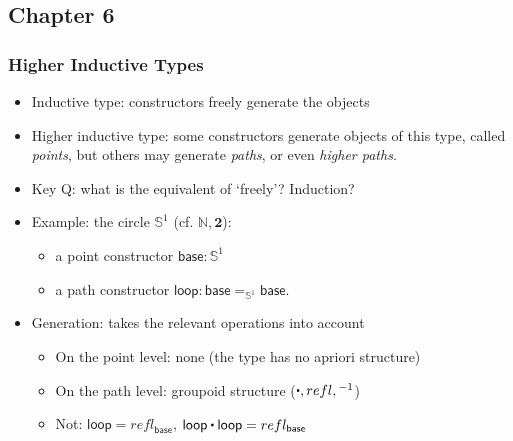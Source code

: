 \documentclass[handout]{beamer}
\newcommand{\Nat}{\mathbb{N}}
\newcommand{\bftwo}{\mathbf{2}}
\newcommand{\ct}{%
  \mathchoice{\mathbin{\raisebox{0.5ex}{$\displaystyle\centerdot$}}}%
             {\mathbin{\raisebox{0.5ex}{$\centerdot$}}}%
             {\mathbin{\raisebox{0.25ex}{$\scriptstyle\,\centerdot\,$}}}%
             {\mathbin{\raisebox{0.1ex}{$\scriptscriptstyle\,\centerdot\,$}}}
}
\begin{document}
    \subsection{Chapter 6}

\newcommand{\Sn}{\mathbb{S}}
\newcommand{\base}{\mathsf{base}}
\newcommand{\lloop}{\mathsf{loop}}
\newcommand{\surf}{\mathsf{surf}}

\frame
  {
    \frametitle{Higher Inductive Types}

    \begin{itemize}[<+->]
    \item Inductive type: constructors freely generate the objects
    \item Higher inductive type: some constructors generate objects of this type, 
             called \emph{points}, but others may generate \emph{paths},
             or even \emph{higher paths}.
    \item Key Q: what is the equivalent of `freely'? Induction?
    \item Example: the circle $\Sn^1$ (cf. $\Nat,\bftwo$):
\begin{itemize}
\item a point constructor $\mathsf{base}:\Sn^1$
\item a path constructor $\lloop : {\base =_{\Sn^1} \base}$.
\end{itemize}
      \item Generation: takes the relevant operations into account
 \begin{itemize}
\item On the point level: none (the type has no apriori structure)
\item On the path level: groupoid structure ($\ct, refl, {}^{-1}$)
\item Not: $\lloop = refl_ {\base}$, $\lloop\ct\lloop = refl_ {\base}$
\end{itemize}
    \end{itemize}
  }
\end{document}
